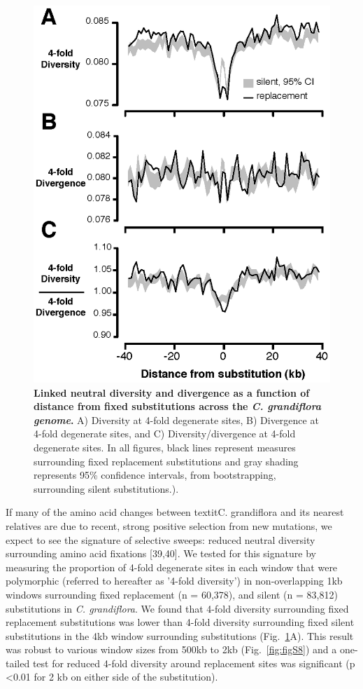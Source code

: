 \begin{figure}[h!]
      \centering
       \includegraphics{Ch2Fig2}
    \caption{\textbf{Linked neutral diversity and divergence as a function of distance from fixed substitutions across the \textit{C. grandiflora genome}.} A) Diversity at 4-fold degenerate sites, B) Divergence at 4-fold degenerate sites, and C) Diversity/divergence at 4-fold degenerate sites. In all figures, black lines represent measures surrounding fixed replacement substitutions and gray shading represents 95\% confidence intervals, from bootstrapping, surrounding silent substitutions.).}
    \label{fig:fig2}
\end{figure}

If many of the amino acid changes between textit{C. grandiflora} and its nearest relatives are due to recent, strong positive selection from new mutations, we expect to see the signature of selective sweeps: reduced neutral diversity surrounding amino acid fixations [39,40]. We tested for this signature by measuring the proportion of 4-fold degenerate sites in each window that were polymorphic (referred to hereafter as '4-fold diversity') in non-overlapping 1kb windows surrounding fixed replacement (n = 60,378), and silent (n = 83,812) substitutions in \textit{C. grandiflora}. We found that 4-fold diversity surrounding fixed replacement substitutions was lower than 4-fold diversity surrounding fixed silent substitutions in the 4kb window surrounding substitutions (Fig.~\ref{fig:fig2}A). This result was robust to various window sizes from 500kb to 2kb (Fig.~\ref{fig:figS8}) and a one-tailed test for reduced 4-fold diversity around replacement sites was significant (p \textless  0.01 for 2 kb on either side of the substitution).

